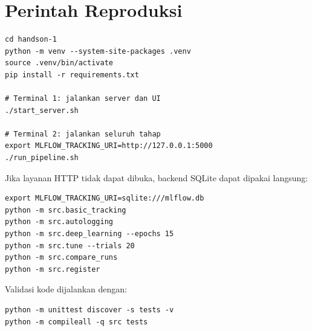 \documentclass[11pt,a4paper]{article}
\begin{document}
\appendix
\section{Perintah Reproduksi}

\begin{lstlisting}[style=terminal]
cd handson-1
python -m venv --system-site-packages .venv
source .venv/bin/activate
pip install -r requirements.txt

# Terminal 1: jalankan server dan UI
./start_server.sh

# Terminal 2: jalankan seluruh tahap
export MLFLOW_TRACKING_URI=http://127.0.0.1:5000
./run_pipeline.sh
\end{lstlisting}

Jika layanan HTTP tidak dapat dibuka, backend SQLite dapat dipakai langsung:

\begin{lstlisting}[style=terminal]
export MLFLOW_TRACKING_URI=sqlite:///mlflow.db
python -m src.basic_tracking
python -m src.autologging
python -m src.deep_learning --epochs 15
python -m src.tune --trials 20
python -m src.compare_runs
python -m src.register
\end{lstlisting}

Validasi kode dijalankan dengan:

\begin{lstlisting}[style=terminal]
python -m unittest discover -s tests -v
python -m compileall -q src tests
\end{lstlisting}
\end{document}

